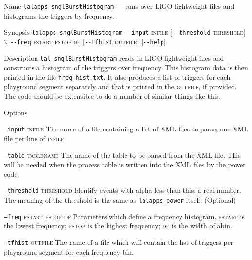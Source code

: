 \begin{entry}

\item[Name]
\verb$lalapps_snglBurstHistogram$ --- runs over LIGO lightweight files and histograms
the triggers by frequency.   

\item[Synopsis]
\verb$lalapps_snglBurstHistogram$ \verb$--input$ \textsc{infile} 
[\verb$--threshold$ \textsc{threshold}]    
$\backslash$ \newline \hspace*{0.25in}
\verb$--freq$ \textsc{fstart} \textsc{fstop} \textsc{df}
[\verb$--tfhist$ \textsc{outfile}] 
[\verb$--help$]

\item[Description] 
\verb$lal_snglBurstHistogram$ reads in LIGO lightweight files and
constructs a histogram of the triggers over frequency. This histogram data 
is then printed in the file \verb$freq-hist.txt$. It also produces a list of triggers for each playground segment separately and that is printed in the \textsc{outfile}, if provided.   The code
should be extensible to do a number of similar things like this.

\item[Options]\leavevmode
\begin{entry}
\item[\texttt{--input}  \textsc{infile}] The name of a file containing
a list of XML files to parse;  one XML file per line of
\textsc{infile}.

\item[\texttt{--table} \textsc{tablename}] The name of the table to be
parsed from the XML file.   This will be needed when the process
table is written into the XML files by the power code.

\item[\texttt{--threshold} \textsc{threshold}] Identify events with alpha
less than this; a real number.  The meaning of the threshold is the same as
\verb$lalapps_power$ itself.  (Optional)

\item[\texttt{--freq} \textsc{fstart} \textsc{fstop} \textsc{df}]
Parameters which define a frequency histogram.  \textsc{fstart} is the
lowest frequency;  \textsc{fstop} is the highest frequency; \textsc{df} 
is the width of abin.

\item[\texttt{--tfhist}  \textsc{outfile}] The name of a file which will 
contain the list of triggers per playground segment for each frequency bin.


\end{entry}
\end{entry}
